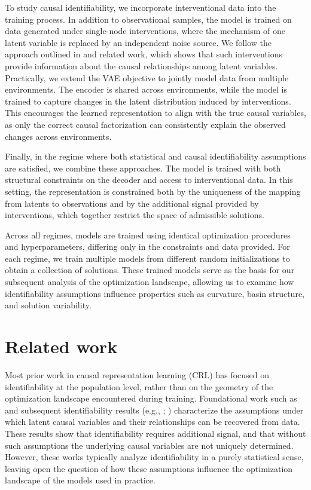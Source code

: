 \documentclass{article} %
\begin{document}
To study causal identifiability, we incorporate interventional data into the training process. In addition to observational samples, the model is trained on data generated under single-node interventions, where the mechanism of one latent variable is replaced by an independent noise source. We follow the approach outlined in \citet{Moran2026CRLFramework} and related work, which shows that such interventions provide information about the causal relationships among latent variables. Practically, we extend the VAE objective to jointly model data from multiple environments. The encoder is shared across environments, while the model is trained to capture changes in the latent distribution induced by interventions. This encourages the learned representation to align with the true causal variables, as only the correct causal factorization can consistently explain the observed changes across environments.

Finally, in the regime where both statistical and causal identifiability assumptions are satisfied, we combine these approaches. The model is trained with both structural constraints on the decoder and access to interventional data. In this setting, the representation is constrained both by the uniqueness of the mapping from latents to observations and by the additional signal provided by interventions, which together restrict the space of admissible solutions.

Across all regimes, models are trained using identical optimization procedures and hyperparameters, differing only in the constraints and data provided. For each regime, we train multiple models from different random initializations to obtain a collection of solutions. These trained models serve as the basis for our subsequent analysis of the optimization landscape, allowing us to examine how identifiability assumptions influence properties such as curvature, basin structure, and solution variability.

\section{Related work}

Most prior work in causal representation learning (CRL) has focused on identifiability at the population level, rather than on the geometry of the optimization landscape encountered during training. Foundational work such as \citet{Scholkopf2021CRL} and subsequent identifiability results (e.g., \citet{VonKugelgen2024IdentifiableCRL}; \citet{Varici2024ScoreCRL}) characterize the assumptions under which latent causal variables and their relationships can be recovered from data. These results show that identifiability requires additional signal, and that without such assumptions the underlying causal variables are not uniquely determined. However, these works typically analyze identifiability in a purely statistical sense, leaving open the question of how these assumptions influence the optimization landscape of the models used in practice.
\end{document}

